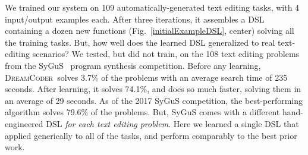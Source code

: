 \documentclass{article}
\newcommand{\system}{\textsc{DreamCoder}~}
\begin{document}
We trained our system on 109 automatically-generated text editing tasks, with 4 input/output examples each.
After three iterations, it assembles a DSL containing a dozen new functions (Fig.~\ref{initialExampleDSL}, center) solving
all the training tasks.
But, how well does the  learned DSL generalized to real text-editing scenarios?
We tested, but did not train, on the 108 text editing problems from the SyGuS~\cite{alur2016sygus} program synthesis competition. Before any learning,
\system solves 3.7\% of the problems with an average search time of 235 seconds.
After learning,
it solves 74.1\%, and does so much faster,
solving them in an average of 29 seconds.
As of the 2017 SyGuS competition,
the best-performing algorithm solves 79.6\% of the problems.
But, SyGuS comes with a
different hand-engineered DSL \emph{for each text editing problem}. %
Here  we learned a single DSL
that applied generically to
all of the tasks,
and perform comparably to the best
prior work.
\end{document}
